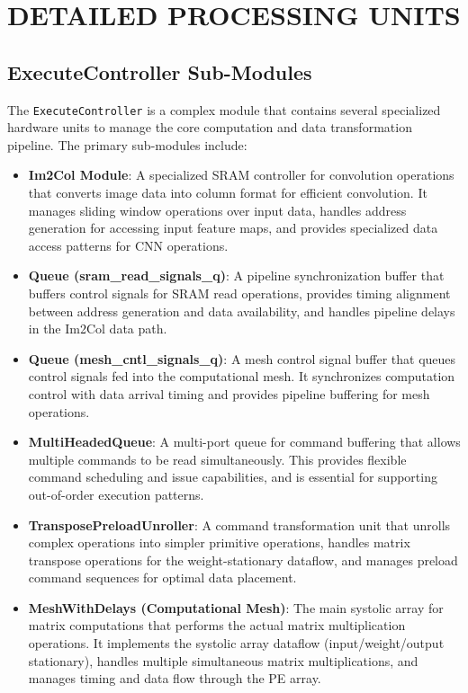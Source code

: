 \renewcommand{\thechapter}{A} %

\chapter{DETAILED PROCESSING UNITS}
\label{app:detailed_processing_units}

\section{ExecuteController Sub-Modules}
\label{app:execute_controller_modules}

The \texttt{ExecuteController} is a complex module that contains several specialized hardware units to manage the core computation and data transformation pipeline. The primary sub-modules include:

\begin{itemize}
    \item \textbf{Im2Col Module}: A specialized SRAM controller for convolution operations that converts image data into column format for efficient convolution. It manages sliding window operations over input data, handles address generation for accessing input feature maps, and provides specialized data access patterns for CNN operations.
    
    \item \textbf{Queue (sram\_read\_signals\_q)}: A pipeline synchronization buffer that buffers control signals for SRAM read operations, provides timing alignment between address generation and data availability, and handles pipeline delays in the Im2Col data path.
    
    \item \textbf{Queue (mesh\_cntl\_signals\_q)}: A mesh control signal buffer that queues control signals fed into the computational mesh. It synchronizes computation control with data arrival timing and provides pipeline buffering for mesh operations.
    
    \item \textbf{MultiHeadedQueue}: A multi-port queue for command buffering that allows multiple commands to be read simultaneously. This provides flexible command scheduling and issue capabilities, and is essential for supporting out-of-order execution patterns.
    
    \item \textbf{TransposePreloadUnroller}: A command transformation unit that unrolls complex operations into simpler primitive operations, handles matrix transpose operations for the weight-stationary dataflow, and manages preload command sequences for optimal data placement.
    
    \item \textbf{MeshWithDelays (Computational Mesh)}: The main systolic array for matrix computations that performs the actual matrix multiplication operations. It implements the systolic array dataflow (input/weight/output stationary), handles multiple simultaneous matrix multiplications, and manages timing and data flow through the PE array.
\end{itemize}

